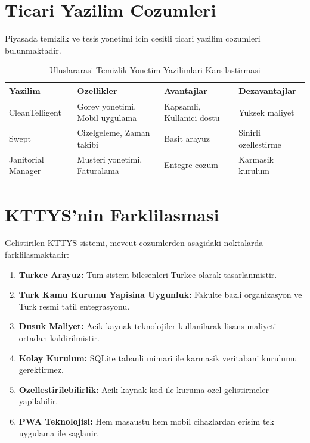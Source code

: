 \section{Ticari Yazilim Cozumleri}
\label{sec:ticari-yazilimlar}

Piyasada temizlik ve tesis yonetimi icin cesitli ticari yazilim 
cozumleri bulunmaktadir.

\begin{table}[H]
\centering
\caption{Uluslararasi Temizlik Yonetim Yazilimlari Karsilastirmasi}
\label{tab:uluslararasi-yazilimlar}
\begin{tabular}{|p{2.5cm}|p{3cm}|p{3cm}|p{3cm}|}
\hline
\textbf{Yazilim} & \textbf{Ozellikler} & \textbf{Avantajlar} & \textbf{Dezavantajlar} \\
\hline
CleanTelligent & Gorev yonetimi, Mobil uygulama & Kapsamli, Kullanici dostu & Yuksek maliyet \\
\hline
Swept & Cizelgeleme, Zaman takibi & Basit arayuz & Sinirli ozellestirme \\
\hline
Janitorial Manager & Musteri yonetimi, Faturalama & Entegre cozum & Karmasik kurulum \\
\hline
\end{tabular}
\end{table}

\section{KTTYS'nin Farklilasmasi}
\label{sec:farkliliklar}

Gelistirilen KTTYS sistemi, mevcut cozumlerden asagidaki 
noktalarda farklilasmaktadir:

\begin{enumerate}
    \item \textbf{Turkce Arayuz:} Tum sistem bilesenleri 
    Turkce olarak tasarlanmistir.
    \item \textbf{Turk Kamu Kurumu Yapisina Uygunluk:} 
    Fakulte bazli organizasyon ve Turk resmi tatil entegrasyonu.
    \item \textbf{Dusuk Maliyet:} Acik kaynak teknolojiler 
    kullanilarak lisans maliyeti ortadan kaldirilmistir.
    \item \textbf{Kolay Kurulum:} SQLite tabanli mimari ile 
    karmasik veritabani kurulumu gerektirmez.
    \item \textbf{Ozellestirilebilirlik:} Acik kaynak kod ile 
    kuruma ozel gelistirmeler yapilabilir.
    \item \textbf{PWA Teknolojisi:} Hem masaustu hem mobil 
    cihazlardan erisim tek uygulama ile saglanir.
\end{enumerate}
